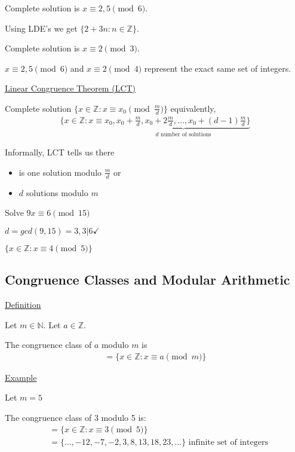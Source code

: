 \documentclass{article}
\begin{document}
Complete solution is $ x \equiv 2,5 \pmod{6}$. 

Using LDE's we get $\{2+3n:n \in \mathbb{Z}\}$.

Complete solution is $x \equiv 2 \pmod{3}$. 

$x \equiv 2,5 \pmod{6}$ and $x \equiv 2 \pmod{4}$ represent the exact same set of integers. 


\underline{Linear Congruence Theorem (LCT)}

Complete solution $\{x \in \mathbb{Z} : x \equiv x_0 \pmod{\frac{m}{d}}\}$ equivalently,
\begin{align*}
 \{x \in \mathbb{Z}: x \equiv x_0, \underbrace{x_0 + \frac{m}{d}, x_0 + 2\frac{m}{d}, \ldots, x_0+(d-1)\frac{m}{d}\}}_{d \text{ number of solutions}} 
\end{align*}

Informally, LCT tells us there 
\begin{itemize}
    \item is one solution modulo $\frac{m}{d}$ or 
    \item $d$ solutions modulo $m$
\end{itemize}

Solve $9x \equiv 6 \pmod{15}$

$d = gcd(9,15) = 3, 3 \vert 6 \checkmark$

$\{x \in \mathbb{Z}: x \equiv 4 \pmod{5}\}$

\subsection{Congruence Classes and Modular Arithmetic}

\underline{Definition}

Let $m \in \mathbb{N}$. Let $a \in \mathbb{Z}$. 

The congruence class of $a$ modulo $m$ is 
\begin{align*}
    [a] = \{x \in \mathbb{Z}: x \equiv a \pmod{m}\}
\end{align*}

\underline{Example}

Let $m=5$

The congruence class of 3 modulo 5 is: 
\begin{align*}
    [3] &= \{x \in \mathbb{Z}: x \equiv 3 \pmod{5}\} \\
    &= \{\ldots, -12, -7, -2, 3, 8, 13, 18, 23,\ldots\} \text{ infinite set of integers}
\end{align*}
\end{document}
